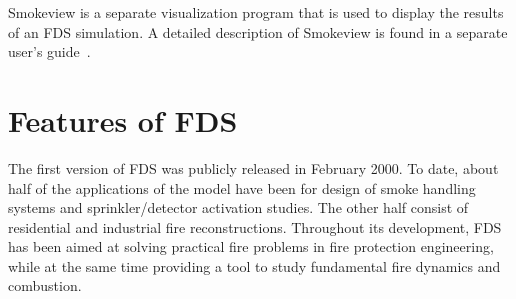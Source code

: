 \documentclass[11pt]{book}
\begin{document}
Smokeview is a separate visualization program that is used to display the results of an FDS simulation. A detailed description of Smokeview is found in a separate user's guide~\cite{Smokeview_Users_Guide}.


\section{Features of FDS}

The first version of FDS was publicly released in February 2000. To date, about half of the applications of the model have been for design of smoke handling systems and sprinkler/detector activation studies. The other half consist of residential and industrial fire reconstructions. Throughout its development, FDS has been aimed at solving practical fire problems in fire protection engineering, while at the same time providing a tool to study fundamental fire dynamics and combustion.
\end{document}
